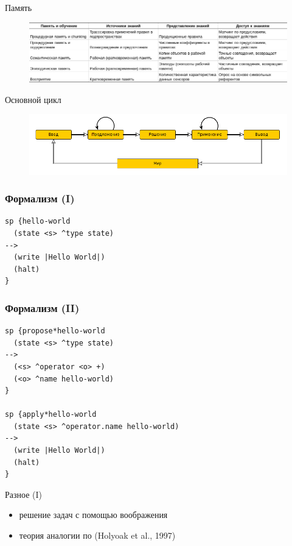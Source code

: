 \documentclass{beamer}
\begin{document}
\begin{frame}{Память}
\begin{center}
	\begin{figure}[H]
		\includegraphics[scale=0.35]{soar-memory.png} 
	\end{figure}
\end{center}
\end{frame}

\begin{frame}{Основной цикл}
\begin{center}
	\begin{figure}[H]
		\includegraphics[scale=0.36]{soar-cycle.png} 
	\end{figure}
\end{center}
\end{frame}


\begin{frame}[fragile]
\frametitle{Формализм (I)}
{\footnotesize \begin{verbatim}
sp {hello-world
  (state <s> ^type state)
-->
  (write |Hello World|)
  (halt)
}
\end{verbatim}}
\end{frame}

\begin{frame}[fragile]
\frametitle{Формализм (II)}
{\footnotesize \begin{verbatim}
sp {propose*hello-world
  (state <s> ^type state)
-->
  (<s> ^operator <o> +)
  (<o> ^name hello-world)
}

sp {apply*hello-world
  (state <s> ^operator.name hello-world)
-->
  (write |Hello World|)
  (halt)
}
\end{verbatim}}
\end{frame}

\begin{frame}{Разное (I)}
\begin{itemize}
	\item решение задач с помощью воображения
	\medskip
	\item теория аналогии по (Holyoak et al., 1997)
\end{itemize}
\end{frame}
\end{document}
